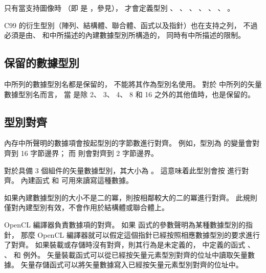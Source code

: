 只有當支持圖像時
（即  是 ，參見），
才會定義型別 、 、 、
 、 、 、
 。

C99 的衍生型別（陣列、結構體、聯合體、函式以及指針）也在支持之列，
不過必須是由、
和中所描述的內建數據型別所構造的，
同時有中所描述的限制。

\subsection{保留的數據型別}

 中所列的數據型別名都是保留的，
不能將其作為型別名使用。
對於 中所列的矢量數據型別名而言，
當  是除 2、 3、 4、 8 和 16 之外的其他值時，也是保留的。

{}

\subsection[sec:alignmentOfTypes]{型別對齊}

內存中所聲明的數據項會按起型別的字節數進行對齊。
例如，型別為  的變量會對齊到 16 字節邊界；
而  則會對齊到 2 字節邊界。

對於具備 3 個組件的矢量數據型別，其大小為 。
這意味着此型別會按  進行對齊。
內建函式  和  可用來讀寫這種數據。

如果內建數據型別的大小不是二的冪，則按相鄰較大的二的冪進行對齊。
此規則僅對內建型別有效，不會作用於結構體或聯合體上。

OpenCL 編譯器負責數據項的對齊。
如果  函式的參數聲明為某種數據型別的指針，
那麼 OpenCL 編譯器就可以假定這個指針已經按照相應數據型別的要求進行了對齊。
如果裝載或存儲時沒有對齊，則其行為是未定義的，
中定義的函式 、 、
  和  例外。
矢量裝載函式可以從已經按矢量元素型別對齊的位址中讀取矢量數據。
矢量存儲函式可以將矢量數據寫入已經按矢量元素型別對齊的位址中。

